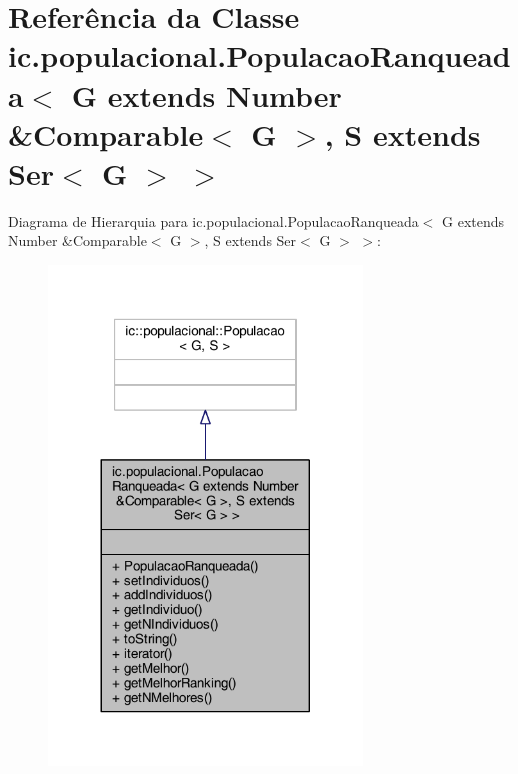 \hypertarget{classic_1_1populacional_1_1_populacao_ranqueada_3_01_g_01extends_01_number_01_6_comparable_3_01_28759d4aa74a34b36c817c3168372e54}{\section{Referência da Classe ic.\-populacional.\-Populacao\-Ranqueada$<$ G extends Number \&Comparable$<$ G $>$, S extends Ser$<$ G $>$ $>$}
\label{classic_1_1populacional_1_1_populacao_ranqueada_3_01_g_01extends_01_number_01_6_comparable_3_01_28759d4aa74a34b36c817c3168372e54}
}


Diagrama de Hierarquia para ic.\-populacional.\-Populacao\-Ranqueada$<$ G extends Number \&Comparable$<$ G $>$, S extends Ser$<$ G $>$ $>$\-:
\nopagebreak
\begin{figure}[H]
\begin{center}
\leavevmode
\includegraphics[width=236pt]{classic_1_1populacional_1_1_populacao_ranqueada_3_01_g_01extends_01_number_01_6_comparable_3_01_891f241b0e115a4fa70b807182fa9c1e}
\end{center}
\end{figure}


